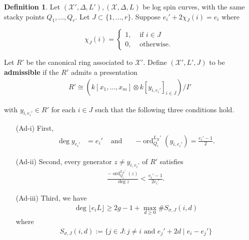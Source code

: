 \documentclass{amsart}
\theoremstyle{plain}
\theoremstyle{definition}
\newtheorem{defn}[thm]{Definition}
\theoremstyle{remark}
\numberwithin{equation}{section}
\newcommand \sx{\mathscr X}
\DeclareMathOperator{\ord}{ord}
\newcommand \subhalf[1]{\frac{{#1} - 1}{2{#1}}}
\newcommand \halfcan{L}
\begin{document}
\begin{defn}
\label{defn:admissible}
Let $(\sx', \Delta, L'),(\sx, \Delta , L)$ be log spin
curves, with the same stacky points $Q_1, \ldots, Q_r$. Let $J \subset
\{1, \ldots, r\}$. Suppose $e_i'+ 2 \chi_J (i) = e_i$ where

$$\chi_J(i) = \begin{cases}
	1, &\text{ if }i \in J\\
	0, &\text{ otherwise. } 
\end{cases}$$

Let $R'$ be the canonical ring associated to $\sx'$. Define $(\sx',L',J)$
to be {\bf admissible} if the $R'$ admits a presentation
\begin{align*}
	R' \cong \left( k[x_1, \ldots, x_m] \otimes k[y_{i, e_i'}]_{i \in J} \right)/I'
\end{align*}

\noindent
with $y_{i, e_i'} \in R'$ for each $i \in J$ such that the following
three conditions hold.


\begin{enumerate}
	\item[(Ad-i)] First, 
	\begin{align*}
	\deg y_{e_i'} &= e_i'  &\text{ and } &&-\ord_{Q_i}^{\halfcan_X'}(y_{i, e_i'})
		= \frac{e_i'- 1}{2}.
	\end{align*}
		\item[(Ad-ii)] Second, every generator $z \neq y_{i, e_i'}$	of $R'$ satisfies
		\begin{align*}
			\frac{-\ord_{Q_i}
^{\halfcan_X'}(z)}{\deg z} < \subhalf {e_i'}.
		\end{align*}
	\item[(Ad-iii)] Third, we have
		\begin{align*}
			\deg \lfloor e_i L \rfloor \geq 2g - 1 + \max_{d \geq 0} \# S_{\sigma, J}(i, d)
		\end{align*}
		where
		\begin{align*}
			S_{\sigma, J}(i, d) := \{j \in J : j \neq i \text{ and } e_j'+2d
			\mid e_i - e_j'\}
		\end{align*}
\end{enumerate}
\end{defn}
\end{document}
